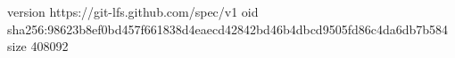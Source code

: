 version https://git-lfs.github.com/spec/v1
oid sha256:98623b8ef0bd457f661838d4eaecd42842bd46b4dbcd9505fd86c4da6db7b584
size 408092
